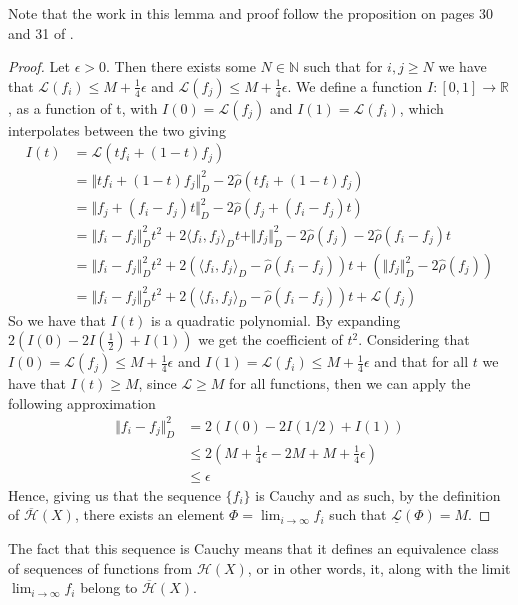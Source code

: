 \documentclass[11pt]{report}
\theoremstyle{definition}
\begin{document}
Note that the work in this lemma and proof follow the proposition on pages 30 and 31 of \cite{notes}.
\begin{proof}
  Let $\epsilon > 0$. Then there exists some $N \in \mathbb{N}$ such that for $i,j \geq N$ we have that $\mathcal{L}(f_i) \leq M + \frac{1}{4}\epsilon$ and $\mathcal{L}(f_j) \leq M + \frac{1}{4}\epsilon$. We define a function $I:[0,1] \rightarrow \mathbb{R}$, as a function of t, with $I(0) = \mathcal{L}(f_j)$ and $I(1) = \mathcal{L}(f_i)$, which interpolates between the two giving
  \begin{align*}
    I(t) &= \mathcal{L}(tf_i + (1-t)f_j) \\
         &= \Vert tf_i + (1-t)f_j \Vert^2_D - 2\hat{\rho}(tf_i + (1-t)f_j) \\
         &= \Vert f_j + (f_i - f_j)t \Vert^2_D - 2\hat{\rho}(f_j + (f_i - f_j)t) \\
         &= \Vert f_i - f_j \Vert^2_Dt^2 + 2\langle f_i, f_j\rangle_Dt + \Vert f_j \Vert^2_D - 2\hat{\rho}(f_j) - 2\hat{\rho}(f_i - f_j)t \\
         &= \Vert f_i - f_j \Vert^2_Dt^2 + 2(\langle f_i, f_j\rangle_D - \hat{\rho}(f_i - f_j))t + (\Vert f_j \Vert^2_D - 2\hat{\rho}(f_j)) \\
         &= \Vert f_i - f_j \Vert^2_Dt^2 + 2(\langle f_i, f_j\rangle_D - \hat{\rho}(f_i - f_j))t + \mathcal{L}(f_j)
  \end{align*}
  So we have that $I(t)$ is a quadratic polynomial. By expanding $2(I(0) - 2I(\frac{1}{2})+I(1))$ we get the coefficient of $t^2$. Considering that $I(0)= \mathcal{L}(f_j) \leq  M + \frac{1}{4}\epsilon$ and $I(1) = \mathcal{L}(f_i) \leq  M + \frac{1}{4}\epsilon$ and that for all $t$ we have that $I(t) \geq M$, since $\mathcal{L} \geq M$ for all functions, then we can apply the following approximation
  \begin{align*}
    \Vert f_i - f_j \Vert^2_D &= 2(I(0) - 2I(1/2)+I(1)) \\
     &\leq 2(M + \frac{1}{4}\epsilon -2M + M + \frac{1}{4}\epsilon) \\
     &\leq \epsilon
  \end{align*}
  Hence, giving us that the sequence $\{f_i\}$ is Cauchy and as such, by the definition of $\overline{\mathcal{H}}(X)$, there exists an element $\Phi = \lim_{i \rightarrow \infty}f_i$ such that $\underline{\mathcal{L}}(\Phi) = M$.
\end{proof}
The fact that this sequence is Cauchy means that it defines an equivalence class of sequences of functions from $\mathcal{H}(X)$, or in other words, it, along with the limit $\lim_{i \rightarrow \infty} f_i$ belong to $\overline{\mathcal{H}}(X)$.
\end{document}
